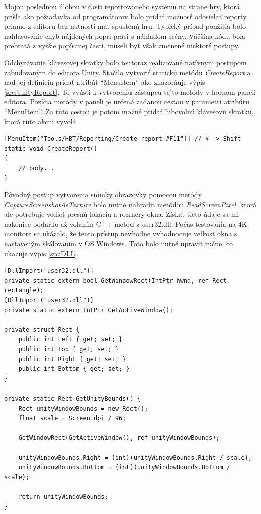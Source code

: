\documentclass[slovak, bachelorpractice]{diploma}
\begin{document}
Mojou poslednou úlohou v časti reportovacieho systému na strane hry, ktorá prišla ako požiadavka od programátorov bolo pridať možnosť odosielať reporty priamo z editoru bez nutnosti mať spustenú hru. Typický prípad použitia bolo nahlasovanie chýb nájdených popri práci s náhľadom scény. Väčšina kódu bola prebratá z vyššie popísanej časti, museli byť však zmenené niektoré postupy. 

Odchytávanie klávesovej skratky bolo tentoraz realizované natívnym postupom zabudovaným do editora Unity. Stačilo vytvoriť statickú metódu \textit{CreateReport} a nad jej definíciu pridať atribút \enquote{MenuItem} ako znázorňuje výpis \ref{src:UnityReport}. To vyústi k vytvoreniu zástupcu tejto metódy v hornom paneli editora. Pozícia metódy v paneli je určená zadanou cestou v parametri atribútu \enquote{MenuItem}. Za túto cestou je potom možné pridať ľubovoľnú klávesovú skratku, ktorá túto akciu vyvolá.
\vspace{10pt}
\begin{lstlisting}[label=src:UnityReport,caption={Odchytenie stlačenia klávesovej skratky v rámci editora Unity}]
[MenuItem("Tools/HBT/Reporting/Create report #F11")] // # -> Shift
static void CreateReport()
{
    // body...
}
\end{lstlisting}
\vspace{5pt}

Pôvodný postup vytvorenia snímky obrazovky pomocou metódy \textit{CaptureScreenshotAsTexture} bolo nutné nahradiť metódou \textit{ReadScreenPixel}, ktorá ale potrebuje vedieť presnú lokáciu a rozmery okna. Získať tieto údaje sa mi nakoniec podarilo až volaním C++ metód z user32.dll. Počas testovania na 4K monitore sa ukázalo, že tento prístup nevhodne vyhodnocuje veľkosť okna s nastaveným škálovaním v OS Windows. Toto bolo nutné upraviť ručne, čo ukazuje výpis \ref{src:DLL}.
\vspace{10pt}
\begin{lstlisting}[label=src:DLL,caption={Získanie veľkosti okna spustenej aplikácie}]
[DllImport("user32.dll")]
private static extern bool GetWindowRect(IntPtr hwnd, ref Rect rectangle);
[DllImport("user32.dll")]
private static extern IntPtr GetActiveWindow();

private struct Rect {
    public int Left { get; set; }
    public int Top { get; set; }
    public int Right { get; set; }
    public int Bottom { get; set; }
}

private static Rect GetUnityBounds() {
    Rect unityWindowBounds = new Rect();
    float scale = Screen.dpi / 96;

    GetWindowRect(GetActiveWindow(), ref unityWindowBounds);

    unityWindowBounds.Right = (int)(unityWindowBounds.Right / scale);
    unityWindowBounds.Bottom = (int)(unityWindowBounds.Bottom / scale);
    
    return unityWindowBounds;
}
\end{lstlisting}
\end{document}
